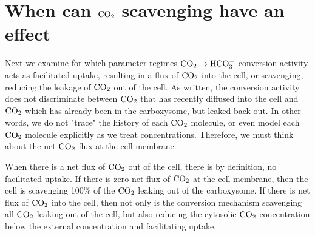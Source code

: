 \documentclass[]{article}
\begin{document}
\section{When can ${\rm CO_2}$ scavenging have an effect}

Next we examine for which parameter regimes ${\rm CO_2} \rightarrow {\rm HCO_3^-}$ conversion activity acts as facilitated uptake, resulting in a flux of ${\rm CO_2}$ into the cell, or scavenging, reducing the leakage of ${\rm CO_2}$ out of the cell. As written, the conversion activity does not discriminate between ${\rm CO_2}$ that has recently diffused into the cell and ${\rm CO_2}$ which has already been in the carboxysome, but leaked back out. In other words, we do not "trace" the history of each ${\rm CO_2}$ molecule, or even model each ${\rm CO_2}$ molecule explicitly as we treat concentrations. Therefore, we must think about the net ${\rm CO_2}$ flux at the cell membrane. 

When there is a net flux of ${\rm CO_2}$ out of the cell, there is by definition, no facilitated uptake. If there is zero net flux of ${\rm CO_2}$ at the cell membrane, then the cell is scavenging 100\% of the ${\rm CO_2}$ leaking out of the carboxysome. If there is net flux of ${\rm CO_2}$ into the cell, then not only is the conversion mechanism scavenging all ${\rm CO_2}$ leaking out of the cell, but also reducing the cytosolic ${\rm CO_2}$ concentration below the external concentration and facilitating uptake.
\end{document}
